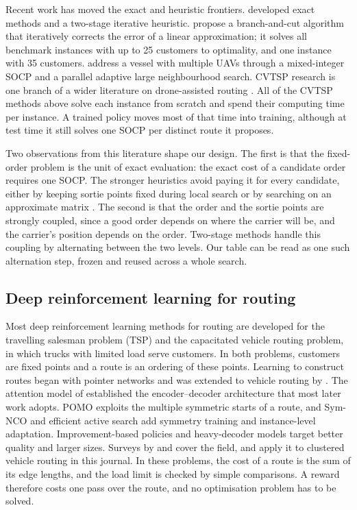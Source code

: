 \documentclass[preprint,12pt,authoryear]{elsarticle}
\begin{document}
Recent work has moved the exact and heuristic frontiers. \citet{li2025} developed exact methods and a two-stage iterative heuristic. \citet{vieira2026} propose a branch-and-cut algorithm that iteratively corrects the error of a linear approximation; it solves all benchmark instances with up to 25 customers to optimality, and one instance with 35 customers. \citet{ren2026} address a vessel with multiple UAVs through a mixed-integer SOCP and a parallel adaptive large neighbourhood search. CVTSP research is one branch of a wider literature on drone-assisted routing \citep{murray2015,agatz2018,otto2018,macrina2020,chung2020}. All of the CVTSP methods above solve each instance from scratch and spend their computing time per instance. A trained policy moves most of that time into training, although at test time it still solves one SOCP per distinct route it proposes.

Two observations from this literature shape our design. The first is that the fixed-order problem is the unit of exact evaluation: the exact cost of a candidate order requires one SOCP. The stronger heuristics avoid paying it for every candidate, either by keeping sortie points fixed during local search \citep{erdogan2021} or by searching on an approximate matrix \citep{li2025}. The second is that the order and the sortie points are strongly coupled, since a good order depends on where the carrier will be, and the carrier's position depends on the order. Two-stage methods handle this coupling by alternating between the two levels. Our table can be read as one such alternation step, frozen and reused across a whole search.

\subsection{Deep reinforcement learning for routing}

Most deep reinforcement learning methods for routing are developed for the travelling salesman problem (TSP) and the capacitated vehicle routing problem, in which trucks with limited load serve customers. In both problems, customers are fixed points and a route is an ordering of these points. Learning to construct routes began with pointer networks \citep{vinyals2015} and was extended to vehicle routing by \citet{nazari2018}. The attention model of \citet{kool2019} established the encoder--decoder architecture that most later work adopts. POMO \citep{kwon2020} exploits the multiple symmetric starts of a route, and Sym-NCO \citep{kim2022} and efficient active search \citep{hottung2022} add symmetry training and instance-level adaptation. Improvement-based policies \citep{wu2022} and heavy-decoder models \citep{luo2023} target better quality and larger sizes. Surveys by \citet{bengio2021} and \citet{mazyavkina2021} cover the field, and \citet{wuy2026} apply it to clustered vehicle routing in this journal. In these problems, the cost of a route is the sum of its edge lengths, and the load limit is checked by simple comparisons. A reward therefore costs one pass over the route, and no optimisation problem has to be solved.
\end{document}
